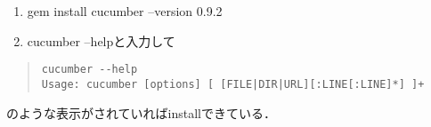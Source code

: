 \begin{enumerate}
\item gem install cucumber --version 0.9.2
\item cucumber --helpと入力して
\end{enumerate}\begin{quote}\begin{verbatim}
cucumber --help
Usage: cucumber [options] [ [FILE|DIR|URL][:LINE[:LINE]*] ]+
\end{verbatim}\end{quote}
のような表示がされていればinstallできている．

